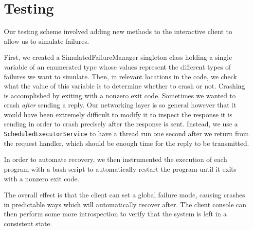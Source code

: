 \documentclass[letterpaper,11pt]{article}
\begin{document}
\section{Testing}

Our testing scheme involved adding new methods to the interactive client to
allow us to simulate failures.

First, we created a SimulatedFailureManager singleton class holding a single
variable of an enumerated type whose values represent the different types of
failures we want to simulate. Then, in relevant locations in the code, we check
what the value of this variable is to determine whether to crash or not.
Crashing is accomplished by exiting with a nonzero exit code. Sometimes we
wanted to crash \emph{after} sending a reply. Our networking layer is so
general however that it would have been extremely difficult to modify it to
inspect the response it is sending in order to crash precisely after the
response is sent. Instead, we use a \texttt{ScheduledExecutorService} to have a
thread run one second after we return from the request handler, which should be
enough time for the reply to be transmitted.

In order to automate recovery, we then instrumented the execution of each
program with a bash script to automatically restart the program until it exits
with a nonzero exit code.

The overall effect is that the client can set a global failure mode, causing
crashes in predictable ways which will automatically recover after. The client
console can then perform some more introspection to verify that the system is
left in a consistent state.
\end{document}
